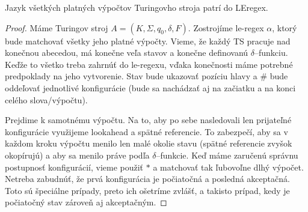 \begin{veta}
Jazyk všetkých platných výpočtov Turingovho stroja patrí do LEregex.
\end{veta}
\begin{proof}
Máme Turingov stroj $A = (K,\Sigma ,q_0,\delta ,F)$. Zostrojíme le-regex $\alpha$, ktorý bude matchovať všetky jeho platné výpočty. Vieme, že každý TS pracuje nad konečnou abecedou, má konečne veľa stavov a konečne definovanú $\delta$--funkciu. Keďže to všetko treba zahrnúť do le-regexu, vďaka konečnosti máme potrebné predpoklady na jeho vytvorenie. Stav bude ukazovať pozíciu hlavy a $\#$ bude oddeľovať jednotlivé kon\-fi\-gu\-rá\-cie (bude sa nachádzať aj na začiatku a na konci celého slova/výpočtu).

Prejdime k samotnému výpočtu. Na to, aby po sebe nasledovali len prijateľné kon\-fi\-gu\-rá\-cie využijeme lookahead a spätné referencie. To zabezpečí, aby sa v každom kroku výpočtu menilo len malé okolie stavu (spätné referencie zvyšok okopírujú) a aby sa menilo práve podľa $\delta$--funkcie. Keď máme zaručenú správnu postupnosť konfigurácií, vieme použiť $*$ a matchovať tak ľubovoľne dlhý výpočet. Netreba zabudnúť, že prvá konfigurácia je počiatočná a posledná akceptačná. Toto sú špeciálne prípady, preto ich ošetríme zvlášť, a takisto prípad, kedy je počiatočný stav zároveň aj akceptačným.


\end{proof}
